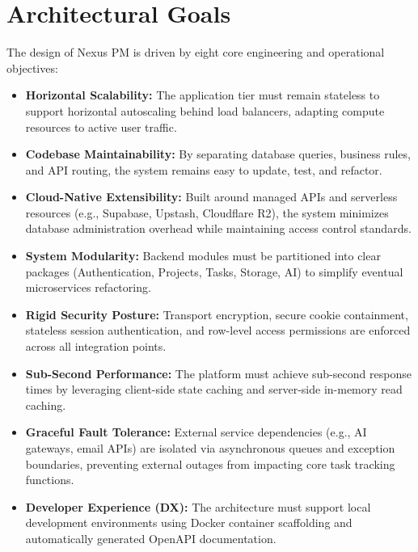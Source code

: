 \section{Architectural Goals}
The design of Nexus PM is driven by eight core engineering and operational objectives:
\begin{itemize}
    \item \textbf{Horizontal Scalability:} The application tier must remain stateless to support horizontal autoscaling behind load balancers, adapting compute resources to active user traffic.
    \item \textbf{Codebase Maintainability:} By separating database queries, business rules, and API routing, the system remains easy to update, test, and refactor.
    \item \textbf{Cloud-Native Extensibility:} Built around managed APIs and serverless resources (e.g., Supabase, Upstash, Cloudflare R2), the system minimizes database administration overhead while maintaining access control standards.
    \item \textbf{System Modularity:} Backend modules must be partitioned into clear packages (Authentication, Projects, Tasks, Storage, AI) to simplify eventual microservices refactoring.
    \item \textbf{Rigid Security Posture:} Transport encryption, secure cookie containment, stateless session authentication, and row-level access permissions are enforced across all integration points.
    \item \textbf{Sub-Second Performance:} The platform must achieve sub-second response times by leveraging client-side state caching and server-side in-memory read caching.
    \item \textbf{Graceful Fault Tolerance:} External service dependencies (e.g., AI gateways, email APIs) are isolated via asynchronous queues and exception boundaries, preventing external outages from impacting core task tracking functions.
    \item \textbf{Developer Experience (DX):} The architecture must support local development environments using Docker container scaffolding and automatically generated OpenAPI documentation.
\end{itemize}

